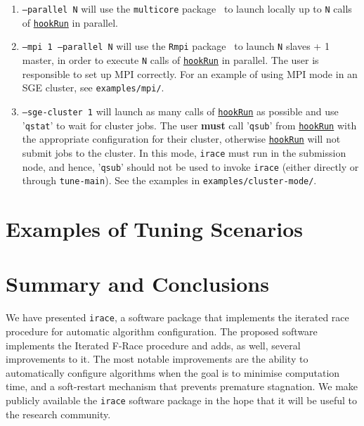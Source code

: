 \documentclass[a4paper]{article}
\newcommand{\irace}{\texttt{irace}\xspace}
\newcommand{\parameter}[1]{\hyperlink{opt:#1}{\texttt{#1}}}
\begin{document}
\begin{enumerate}
\item \texttt{--parallel N}\hspace{2ex} will use the \texttt{multicore} package~\citep{R:multicore} to launch locally
  up to \texttt{N} calls of \parameter{hookRun} in parallel.

  \item \texttt{--mpi 1 --parallel N}\hspace{2ex}  will use the \texttt{Rmpi} package~\cite{R:Rmpi} to launch \texttt{N}
  slaves + 1 master, in order to execute \texttt{N} calls of \parameter{hookRun} in
  parallel. The user is responsible to set up MPI correctly. For an
  example of using MPI mode in an SGE cluster, see \texttt{examples/mpi/}.

\item \texttt{--sge-cluster 1}\hspace{2ex}  will launch as many calls
  of \parameter{hookRun} as possible and use '\texttt{qstat}' to wait
  for cluster jobs. The user \textbf{must} call '\texttt{qsub}'
  from \parameter{hookRun} with the appropriate configuration for
  their cluster, otherwise \parameter{hookRun} will not submit jobs to
  the cluster. In this mode, \irace must run in the submission node,
  and hence, '\texttt{qsub}' should not be used to invoke \irace
  (either directly or through \texttt{tune-main}).  See the examples
  in \texttt{examples/cluster-mode/}.
\end{enumerate}


\section{Examples of Tuning Scenarios}\label{sec:applications}







\section{Summary and Conclusions}

We have presented \irace, a software package that implements the
iterated race procedure for automatic algorithm configuration. The
proposed software implements the Iterated F-Race procedure and adds,
as well, several improvements to it. The most notable improvements are
the ability to automatically configure algorithms when the goal is to
minimise computation time, and a soft-restart mechanism that prevents
premature stagnation. We make publicly available the \irace software
package in the hope that it will be useful to the research community.
\end{document}
